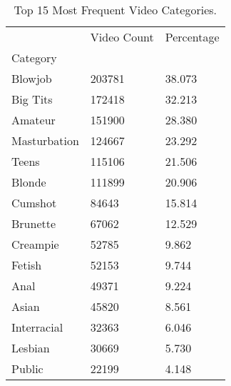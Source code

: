 \begin{table}[htbp]
\centering
\caption{Top 15 Most Frequent Video Categories.}
\label{tab:top-categories}
\begin{tabular}{lll}
\toprule
 & Video Count & Percentage \\
Category &  &  \\
\midrule
Blowjob & 203781 & 38.073 \\
Big Tits & 172418 & 32.213 \\
Amateur & 151900 & 28.380 \\
Masturbation & 124667 & 23.292 \\
Teens & 115106 & 21.506 \\
Blonde & 111899 & 20.906 \\
Cumshot & 84643 & 15.814 \\
Brunette & 67062 & 12.529 \\
Creampie & 52785 & 9.862 \\
Fetish & 52153 & 9.744 \\
Anal & 49371 & 9.224 \\
Asian & 45820 & 8.561 \\
Interracial & 32363 & 6.046 \\
Lesbian & 30669 & 5.730 \\
Public & 22199 & 4.148 \\
\bottomrule
\end{tabular}

\end{table}